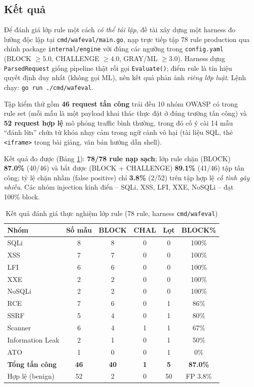 \documentclass[../DoAn.tex]{subfiles}
\begin{document}
\subsection{Kết quả}
\label{subsection:5.2.3}

Để đánh giá lớp rule một cách \textit{có thể tái lập}, đề tài xây dựng một
harness đo lường độc lập tại \texttt{cmd/wafeval/main.go}, nạp trực tiếp tập
78 rule production qua chính package \texttt{internal/engine} với đúng các
ngưỡng trong \texttt{config.yaml} (BLOCK \(\ge 5.0\), CHALLENGE \(\ge 4.0\),
GRAY/ML \(\ge 3.0\)). Harness dựng \texttt{ParsedRequest} giống pipeline thật
rồi gọi \texttt{Evaluate()}; điểm rule là tín hiệu quyết định duy nhất (không
gọi ML), nên kết quả phản ánh \textit{riêng lớp luật}. Lệnh chạy:
\texttt{go run ./cmd/wafeval}.

Tập kiểm thử gồm \textbf{46 request tấn công} trải đều 10 nhóm OWASP có trong
rule set (mỗi mẫu là một payload khai thác thực đặt ở đúng trường tấn công) và
\textbf{52 request hợp lệ} mô phỏng traffic bình thường, trong đó cố ý cài 14
mẫu ``đánh lừa'' chứa từ khóa nhạy cảm trong ngữ cảnh vô hại (tài liệu SQL,
thẻ \texttt{<iframe>} trong bài giảng, văn bản hướng dẫn shell).

Kết quả đo được (Bảng \ref{table:waf-eval}): \textbf{78/78 rule nạp sạch}; lớp
rule chặn (BLOCK) \textbf{87.0\%} (40/46) và bắt được (BLOCK + CHALLENGE)
\textbf{89.1\%} (41/46) tập tấn công; tỷ lệ chặn nhầm (false positive) chỉ
\textbf{3.8\%} (2/52) trên tập hợp lệ \textit{cố tình gây nhiễu}. Các nhóm
injection kinh điển -- SQLi, XSS, LFI, XXE, NoSQLi -- đạt 100\% block.

\begin{table}[h!]
\centering
\caption{Kết quả đánh giá thực nghiệm lớp rule (78 rule, harness \texttt{cmd/wafeval})}
\label{table:waf-eval}
\small
\begin{tabular}{|l|c|c|c|c|c|}
\hline
\textbf{Nhóm} & \textbf{Số mẫu} & \textbf{BLOCK} & \textbf{CHAL} & \textbf{Lọt} & \textbf{BLOCK\%} \\
\hline
SQLi & 8 & 8 & 0 & 0 & 100\% \\
\hline
XSS & 7 & 7 & 0 & 0 & 100\% \\
\hline
LFI & 6 & 6 & 0 & 0 & 100\% \\
\hline
XXE & 2 & 2 & 0 & 0 & 100\% \\
\hline
NoSQLi & 2 & 2 & 0 & 0 & 100\% \\
\hline
RCE & 7 & 6 & 0 & 1 & 86\% \\
\hline
SSRF & 5 & 4 & 0 & 1 & 80\% \\
\hline
Scanner & 6 & 4 & 1 & 1 & 67\% \\
\hline
Information Leak & 2 & 1 & 0 & 1 & 50\% \\
\hline
ATO & 1 & 0 & 0 & 1 & 0\% \\
\hline
\textbf{Tổng tấn công} & \textbf{46} & \textbf{40} & \textbf{1} & \textbf{5} & \textbf{87.0\%} \\
\hline
Hợp lệ (benign) & 52 & 2 & 0 & 50 & FP 3.8\% \\
\hline
\end{tabular}
\end{table}
\end{document}
